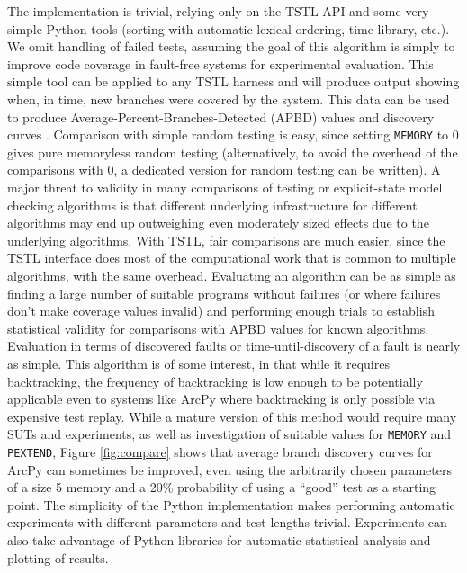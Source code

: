 The implementation is trivial, relying only on the TSTL API and some very simple Python tools (sorting with automatic lexical ordering, time library, etc.).  We omit handling of failed tests, assuming the goal of this algorithm is simply to improve code coverage in fault-free systems for experimental evaluation.  This simple tool can be applied to any TSTL harness and will produce output showing when, in time, new branches were covered by the system.  This data can be used to produce Average-Percent-Branches-Detected (APBD) values and discovery curves \cite{issta14,Rothermel1999,rothermel01oct}. Comparison with simple random testing is easy, since setting {\tt MEMORY} to 0 gives pure memoryless random testing (alternatively, to avoid the overhead of the comparisons with 0, a dedicated version for random testing can be written).  A major threat to validity in many comparisons of testing or explicit-state model checking algorithms is that different underlying infrastructure for different algorithms may end up outweighing even moderately sized effects due to the underlying algorithms.  With TSTL, fair comparisons are much easier, since the TSTL interface does most of the computational work that is common to multiple algorithms, with the same overhead.  Evaluating an algorithm can be as simple as finding a large number of suitable programs without failures (or where failures don't make coverage values invalid) and performing enough trials to establish statistical validity for comparisons with APBD values for known algorithms.  Evaluation in terms of discovered faults or time-until-discovery of a fault is nearly as simple.  This algorithm is of some interest, in that while it requires backtracking, the frequency of backtracking is low enough to be potentially applicable even to systems like ArcPy where backtracking is only possible via expensive test replay.  While a mature version of this method would require many SUTs and experiments, as well as investigation of suitable values for {\tt MEMORY} and {\tt PEXTEND}, Figure \ref{fig:compare} shows that average branch discovery curves for ArcPy can sometimes be improved, even using the  arbitrarily chosen parameters of a size 5 memory and a 20\% probability of using a ``good'' test as a starting point.  The simplicity of the Python implementation makes performing automatic experiments with different parameters and test lengths trivial.  Experiments can also take advantage of Python libraries for automatic statistical analysis and plotting of results.


